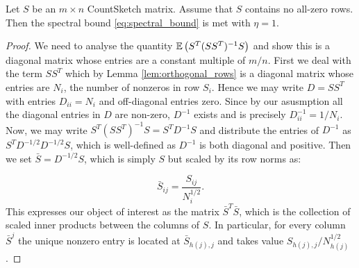 \begin{thm} \label{thm: spectral-theorem}
  Let $S$ be an $m \times n$ CountSketch matrix.
  Assume that $S$ contains no all-zero rows.
  Then the spectral bound \eqref{eq:spectral_bound} is met with $\eta = 1$.
\end{thm}

\begin{proof}
  We need to analyse the quantity $\mathbb{E} \left( S^T (S S^T)^{-1} S \right)$ and
  show this is a diagonal matrix whose entries are a constant multiple of $m/n$.
  First we deal with the term $SS^T$ which by Lemma \ref{lem:orthogonal_rows}
 is a diagonal matrix whose entries are $N_i$, the number of nonzeros in row
  $S_i$.
  Hence we may write $D = SS^T$ with entries $D_{ii} = N_i$ and
  off-diagonal entries zero.
  Since by our asusmption
  all the diagonal entries in $D$ are non-zero, $D^{-1}$ exists and is
  precisely $D^{-1}_{ii} = 1/ N_i$. %
  Now, we may write $S^T (SS^T)^{-1} S = S^T D^{-1} S $ and distribute the
  entries of $D^{-1}$ as $S^T D^{-1/2} D^{-1/2} S$, which is well-defined as
  $D^{-1}$ is both diagonal and positive.
Then we set $\bar{S} = D^{-1/2} S$, which is simply $S$ but scaled by its row norms as:

  \begin{equation} \label{eq: S-bar_vals}
    \bar{S}_{ij} = \frac{S_{ij}}{N_i^{1/2}}.
  \end{equation}
This expresses our object of interest as the matrix $\bar{S}^T \bar{S}$, which is the collection
  of scaled inner products between the columns of $S$.
  In particular, for every column $\bar{S}^j$ the unique nonzero entry is located at
  $\bar{S}_{h(j),j}$ and takes value $S_{h(j),j}/N_{h(j)}^{1/2}$.



\end{proof}
